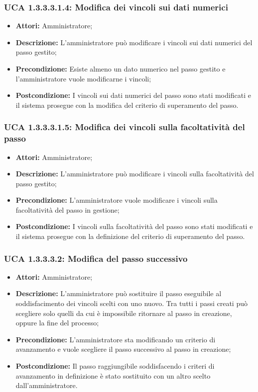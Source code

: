 \subsubsection{UCA 1.3.3.3.1.4: Modifica dei vincoli sui dati numerici}
\begin{itemize}
\item \textbf{Attori:}
Amministratore;
\item \textbf{Descrizione:}
L'amministratore può modificare i vincoli sui dati numerici del passo gestito;
\item \textbf{Precondizione:}
Esiste almeno un dato numerico nel passo gestito e l'amministratore vuole modificarne i vincoli;
\item \textbf{Postcondizione:}
I vincoli sui dati numerici del passo sono stati modificati e il sistema prosegue con la modifica del criterio di superamento del passo.
\end{itemize}

\hypertarget{A1.3.3.3.1.5}{}
\subsubsection{UCA 1.3.3.3.1.5: Modifica dei vincoli sulla facoltatività del passo}
\begin{itemize}
\item \textbf{Attori:}
Amministratore;
\item \textbf{Descrizione:}
L'amministratore può modificare i vincoli sulla facoltatività del passo gestito;
\item \textbf{Precondizione:}
L'amministratore vuole modificare i vincoli sulla facoltatività del passo in gestione;
\item \textbf{Postcondizione:}
I vincoli sulla facoltatività del passo sono stati modificati e il sistema prosegue con la definizione del criterio di superamento del passo.
\end{itemize}

\hypertarget{A1.3.3.3.2}{}
\subsubsection{UCA 1.3.3.3.2: Modifica del passo successivo}
\begin{itemize}
\item \textbf{Attori:}
Amministratore;
\item \textbf{Descrizione:}
L'amministratore può sostituire il passo eseguibile al soddisfacimento dei vincoli scelti con uno nuovo. Tra tutti i passi creati può scegliere solo quelli da cui è impossibile ritornare al passo in creazione, oppure la fine del processo;
\item \textbf{Precondizione:}
L'amministratore sta modificando un criterio di avanzamento e vuole scegliere il passo successivo al passo in creazione;
\item \textbf{Postcondizione:}
Il passo raggiungibile soddisfacendo i criteri di avanzamento in definizione è stato sostituito con un altro scelto dall'amministratore.
\end{itemize}

